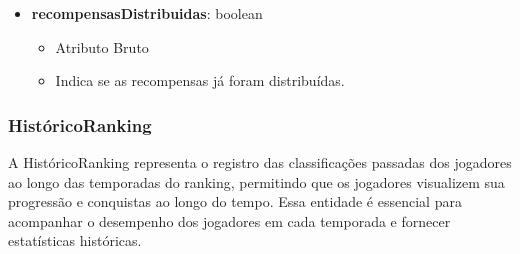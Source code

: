 \begin{itemize}
        \item \textbf{recompensasDistribuidas}: boolean  
              \begin{itemize}
                  \item Atributo Bruto
                  \item Indica se as recompensas já foram distribuídas.
              \end{itemize}
    \end{itemize}

    \subsubsection{HistóricoRanking}
    A HistóricoRanking representa o registro das classificações passadas dos jogadores ao longo das temporadas do ranking, permitindo que os jogadores visualizem sua progressão e conquistas ao longo do tempo. Essa entidade é essencial para acompanhar o desempenho dos jogadores em cada temporada e fornecer estatísticas históricas.
